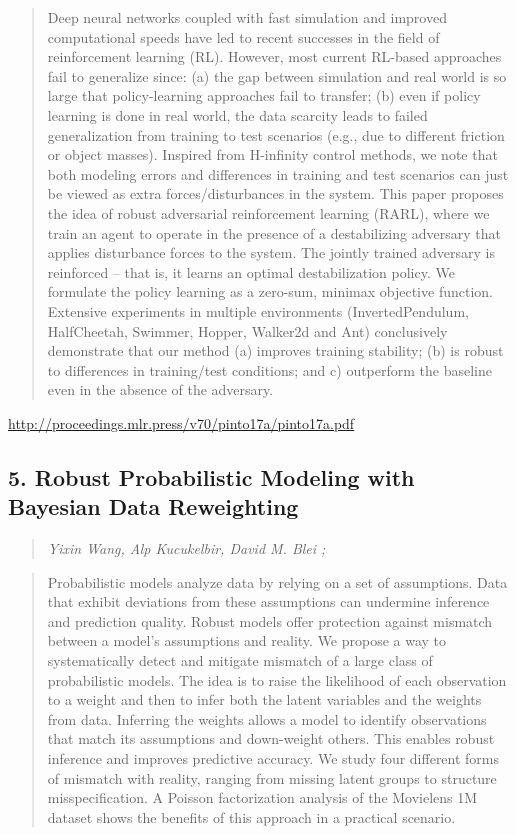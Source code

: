 \documentclass{article}
\begin{document}
\begin{quote}
    Deep neural networks coupled with fast simulation and improved computational speeds have led to recent successes in the field of reinforcement learning (RL). However, most current RL-based approaches fail to generalize since: (a) the gap between simulation and real world is so large that policy-learning approaches fail to transfer; (b) even if policy learning is done in real world, the data scarcity leads to failed generalization from training to test scenarios (e.g., due to different friction or object masses). Inspired from H-infinity control methods, we note that both modeling errors and differences in training and test scenarios can just be viewed as extra forces/disturbances in the system. This paper proposes the idea of robust adversarial reinforcement learning (RARL), where we train an agent to operate in the presence of a destabilizing adversary that applies disturbance forces to the system. The jointly trained adversary is reinforced – that is, it learns an optimal destabilization policy. We formulate the policy learning as a zero-sum, minimax objective function. Extensive experiments in multiple environments (InvertedPendulum, HalfCheetah, Swimmer, Hopper, Walker2d and Ant) conclusively demonstrate that our method (a) improves training stability; (b) is robust to differences in training/test conditions; and c) outperform the baseline even in the absence of the adversary.  \end{quote}

\href{http://proceedings.mlr.press/v70/pinto17a/pinto17a.pdf}{http://proceedings.mlr.press/v70/pinto17a/pinto17a.pdf}

\subsection{5. Robust Probabilistic Modeling with Bayesian Data Reweighting}

\begin{quote}
\footnotesize{\textit{Yixin Wang, Alp Kucukelbir, David M. Blei ;}}
\end{quote}

\begin{quote}
    Probabilistic models analyze data by relying on a set of assumptions. Data that exhibit deviations from these assumptions can undermine inference and prediction quality. Robust models offer protection against mismatch between a model’s assumptions and reality. We propose a way to systematically detect and mitigate mismatch of a large class of probabilistic models. The idea is to raise the likelihood of each observation to a weight and then to infer both the latent variables and the weights from data. Inferring the weights allows a model to identify observations that match its assumptions and down-weight others. This enables robust inference and improves predictive accuracy. We study four different forms of mismatch with reality, ranging from missing latent groups to structure misspecification. A Poisson factorization analysis of the Movielens 1M dataset shows the benefits of this approach in a practical scenario.  \end{quote}
\end{document}
